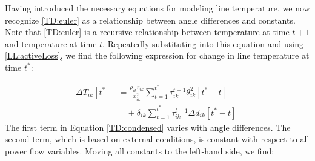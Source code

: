 \documentclass[conference]{IEEEtran}
\begin{document}
Having introduced the necessary equations for modeling line temperature, we now recognize \eqref{TD:euler} as a relationship between angle differences and constants. Note that \eqref{TD:euler} is a recursive relationship between temperature at time $t+1$ and temperature at time $t$. Repeatedly substituting into this equation and using \eqref{LL:activeLoss}, we find the following expression for change in line temperature at time $t^*$:
%

\begin{align}
\label{TD:condensed}
\Delta T_{ik}[t^*] &= \frac{\rho_{ik} r_{ik}}{x_{ik}^2}\sum_{t=1}^{t^*}\tau_{ik}^{t-1}\theta_{ik}^2[t^*-t]~ + \\
\nonumber &\quad + \delta_{ik} \sum_{t=1}^{t^*}\tau_{ik}^{t-1}\Delta d_{ik} [t^* - t]
\end{align}
The first term in Equation \eqref{TD:condensed} varies with angle differences. The second term, which is based on external conditions, is constant with respect to all power flow variables. Moving all constants to the left-hand side, we find:
\end{document}
